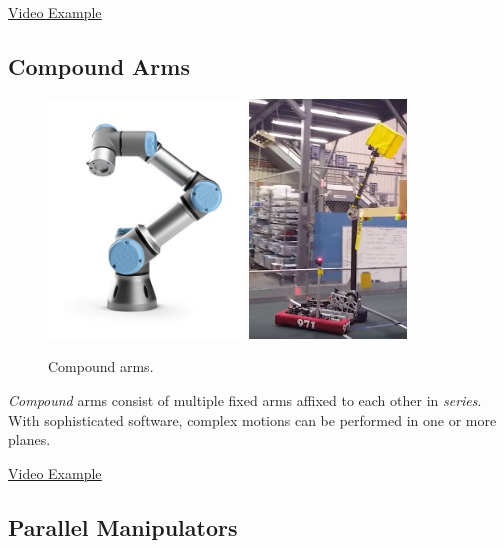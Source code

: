 \href{https://www.youtube.com/watch?v=iFq8dKUZOww}{\color{red}\underline{Video Example}}

\subsection{Compound Arms}

\begin{figure}[H]
	\includegraphics[height=2.5in]{imgs/universal_robot.jpeg}
	\includegraphics[height=2.5in]{imgs/tachyon.jpeg}
	\caption{Compound arms.}
\end{figure}

\textit{Compound} arms consist of multiple fixed arms affixed to each other in \textit{series}. With sophisticated software, complex motions can be performed in one or more planes.

\href{https://youtu.be/Hf9W-FHmfg0?t=15}{\color{red}\underline{Video Example}}

\subsection{Parallel Manipulators}

